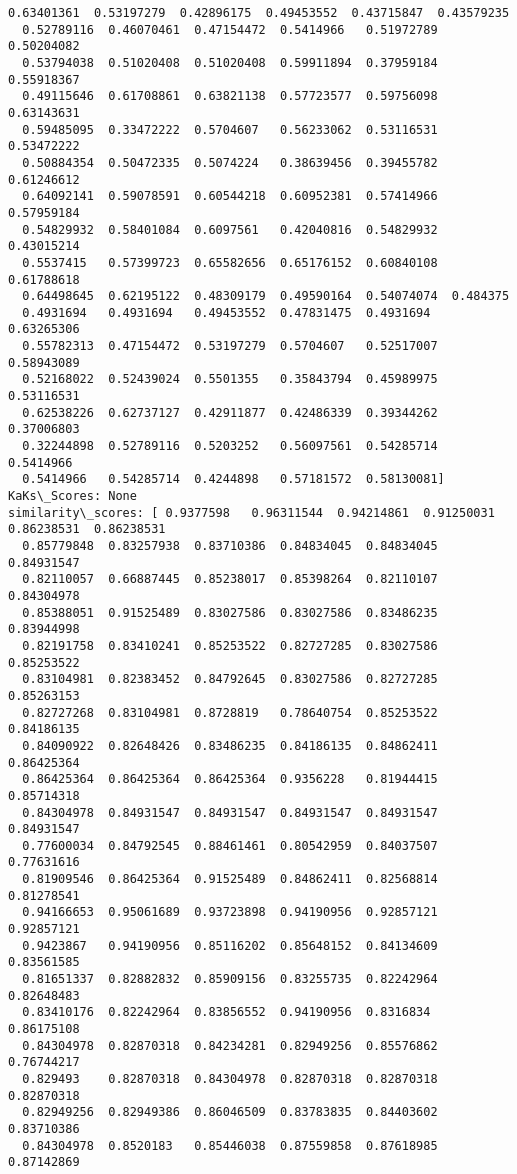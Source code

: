 \documentclass[11pt]{article}
\begin{document}
\begin{Verbatim}[commandchars=\\\{\}]
  0.63401361  0.53197279  0.42896175  0.49453552  0.43715847  0.43579235
  0.52789116  0.46070461  0.47154472  0.5414966   0.51972789  0.50204082
  0.53794038  0.51020408  0.51020408  0.59911894  0.37959184  0.55918367
  0.49115646  0.61708861  0.63821138  0.57723577  0.59756098  0.63143631
  0.59485095  0.33472222  0.5704607   0.56233062  0.53116531  0.53472222
  0.50884354  0.50472335  0.5074224   0.38639456  0.39455782  0.61246612
  0.64092141  0.59078591  0.60544218  0.60952381  0.57414966  0.57959184
  0.54829932  0.58401084  0.6097561   0.42040816  0.54829932  0.43015214
  0.5537415   0.57399723  0.65582656  0.65176152  0.60840108  0.61788618
  0.64498645  0.62195122  0.48309179  0.49590164  0.54074074  0.484375
  0.4931694   0.4931694   0.49453552  0.47831475  0.4931694   0.63265306
  0.55782313  0.47154472  0.53197279  0.5704607   0.52517007  0.58943089
  0.52168022  0.52439024  0.5501355   0.35843794  0.45989975  0.53116531
  0.62538226  0.62737127  0.42911877  0.42486339  0.39344262  0.37006803
  0.32244898  0.52789116  0.5203252   0.56097561  0.54285714  0.5414966
  0.5414966   0.54285714  0.4244898   0.57181572  0.58130081]
KaKs\_Scores: None
similarity\_scores: [ 0.9377598   0.96311544  0.94214861  0.91250031  0.86238531  0.86238531
  0.85779848  0.83257938  0.83710386  0.84834045  0.84834045  0.84931547
  0.82110057  0.66887445  0.85238017  0.85398264  0.82110107  0.84304978
  0.85388051  0.91525489  0.83027586  0.83027586  0.83486235  0.83944998
  0.82191758  0.83410241  0.85253522  0.82727285  0.83027586  0.85253522
  0.83104981  0.82383452  0.84792645  0.83027586  0.82727285  0.85263153
  0.82727268  0.83104981  0.8728819   0.78640754  0.85253522  0.84186135
  0.84090922  0.82648426  0.83486235  0.84186135  0.84862411  0.86425364
  0.86425364  0.86425364  0.86425364  0.9356228   0.81944415  0.85714318
  0.84304978  0.84931547  0.84931547  0.84931547  0.84931547  0.84931547
  0.77600034  0.84792545  0.88461461  0.80542959  0.84037507  0.77631616
  0.81909546  0.86425364  0.91525489  0.84862411  0.82568814  0.81278541
  0.94166653  0.95061689  0.93723898  0.94190956  0.92857121  0.92857121
  0.9423867   0.94190956  0.85116202  0.85648152  0.84134609  0.83561585
  0.81651337  0.82882832  0.85909156  0.83255735  0.82242964  0.82648483
  0.83410176  0.82242964  0.83856552  0.94190956  0.8316834   0.86175108
  0.84304978  0.82870318  0.84234281  0.82949256  0.85576862  0.76744217
  0.829493    0.82870318  0.84304978  0.82870318  0.82870318  0.82870318
  0.82949256  0.82949386  0.86046509  0.83783835  0.84403602  0.83710386
  0.84304978  0.8520183   0.85446038  0.87559858  0.87618985  0.87142869

\end{Verbatim}
\end{document}

